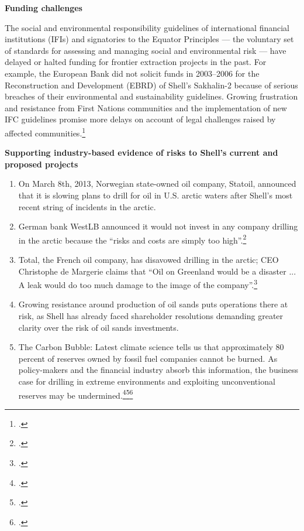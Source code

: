 \documentclass[10pt]{article}
\begin{document}
\textbf{Funding challenges}



The social and environmental responsibility guidelines of international financial institutions (IFIs) and signatories to the Equator Principles --- the voluntary set of standards for assessing and managing social and environmental risk --- have delayed or halted funding for frontier extraction projects in the past. 
For example, the European Bank did not solicit funds in 2003--2006 for the Reconstruction and Development (EBRD) of Shell's Sakhalin-2 because of serious breaches of their environmental and sustainability guidelines. 
Growing frustration and resistance from First Nations communities and the implementation of new IFC guidelines promise more delays on account of legal challenges raised by affected communities.\footcite[][]{Mathiason_2005}



\textbf{Supporting industry-based evidence of risks to Shell's current and proposed projects}



\begin{enumerate}
	\item On March 8th, 2013, Norwegian state-owned oil company, Statoil, announced that it is slowing plans to drill for oil in U.S. arctic waters after Shell's most recent string of incidents in the arctic.
	\item German bank WestLB announced it would not invest in any company drilling in the arctic because the ``risks and costs are simply too high''.\footcite[][]{Naidoo_2012}
	\item Total, the French oil company, has disavowed drilling in the arctic; CEO Christophe de Margerie claims that ``Oil on Greenland would be a disaster ... A leak would do too much damage to the image of the company''.\footcite[][]{NewsWire_2012}
	\item Growing resistance around production of oil sands puts operations there at risk, as Shell has already faced shareholder resolutions demanding greater clarity over the risk of oil sands investments.
	\item The Carbon Bubble: Latest climate science tells us that approximately 80 percent of reserves owned by fossil fuel companies cannot be burned. As policy-makers and the financial industry absorb this information, the business case for drilling in extreme environments and exploiting unconventional reserves may be undermined.\footcite[][]{carbontracker}\footcite[][]{UNEP_2009}\footcite[][]{HSBC_2013}
\end{enumerate}
\end{document}
